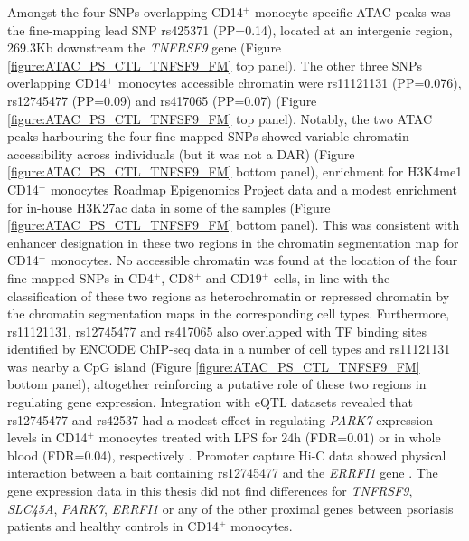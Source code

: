 Amongst the four SNPs overlapping CD14$^+$ monocyte-specific ATAC peaks was the fine-mapping lead SNP rs425371 (PP=0.14), located at an intergenic region, 269.3Kb downstream the \textit{TNFRSF9} gene (Figure \ref{figure:ATAC_PS_CTL_TNFSF9_FM} top panel). The other three SNPs overlapping CD14$^+$ monocytes accessible chromatin were rs11121131 (PP=0.076), rs12745477 (PP=0.09) and rs417065 (PP=0.07) (Figure \ref{figure:ATAC_PS_CTL_TNFSF9_FM} top panel). Notably, the two ATAC peaks harbouring the four fine-mapped SNPs showed variable chromatin accessibility across individuals (but it was not a DAR) (Figure \ref{figure:ATAC_PS_CTL_TNFSF9_FM} bottom panel), enrichment for H3K4me1 CD14$^+$ monocytes Roadmap Epigenomics Project data and a modest enrichment for in-house H3K27ac data in some of the samples (Figure \ref{figure:ATAC_PS_CTL_TNFSF9_FM} bottom panel). This was consistent with enhancer designation in these two regions in the chromatin segmentation map for CD14$^+$ monocytes. No accessible chromatin was found at the location of the four fine-mapped SNPs in CD4$^+$, CD8$^+$ and CD19$^+$ cells, in line with the classification of these two regions as heterochromatin or repressed chromatin by the chromatin segmentation maps in the corresponding cell types. Furthermore, rs11121131, rs12745477 and rs417065 also overlapped with TF binding sites identified by ENCODE ChIP-seq data in a number of cell types and rs11121131 was nearby a CpG island (Figure \ref{figure:ATAC_PS_CTL_TNFSF9_FM} bottom panel), altogether reinforcing a putative role of these two regions in regulating gene expression. Integration with eQTL datasets revealed that rs12745477 and rs42537 had a modest effect in regulating \textit{PARK7} expression levels in CD14$^+$ monocytes treated with LPS for 24h (FDR=0.01) or in whole blood (FDR=0.04), respectively \parencite{Fairfax2012,Westra2013}. Promoter capture Hi-C data showed physical interaction between a bait containing rs12745477 and the \textit{ERRFI1} gene \parencite{Javierre2016}. The gene expression data in this thesis did not find differences for \textit{TNFRSF9}, \textit{SLC45A}, \textit{PARK7}, \textit{ERRFI1} or any of the other proximal genes between psoriasis patients and healthy controls in CD14$^+$ monocytes.


